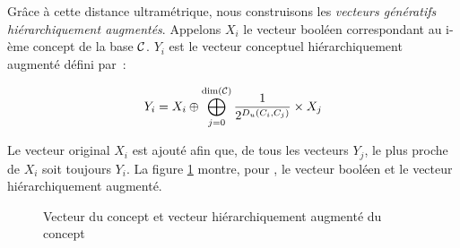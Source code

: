 Grâce à cette  distance ultramétrique,
nous construisons les \emph{vecteurs génératifs hiérarchiquement
  augmentés}. Appelons $X_i$ le vecteur booléen correspondant au i-ème
concept de la base $\cal C$.  $Y_i$ est le vecteur conceptuel
hiérarchiquement augmenté défini par~:

\begin{equation}
Y_{i} =  X_{i} \oplus \bigoplus_{j=0}^{\dim(\cal C)} 
{\frac{1}{2^{D_{u}(C_{i}, C_{j})}}} \times X_{j}
\end{equation}

Le vecteur original $X_i$ est ajouté afin que, de tous les vecteurs
$Y_j$, le plus proche de $X_i$ soit toujours $Y_i$. La figure
\ref{boolEtHierPaix} montre, pour , le vecteur booléen et
le vecteur hiérarchiquement augmenté.

\begin{figure}[h]
    \caption{Vecteur du concept  et vecteur hiérarchiquement augmenté du concept }
    \label{boolEtHierPaix}
\end{figure}

